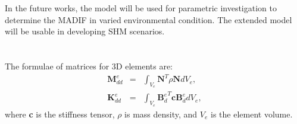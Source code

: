 \documentclass[sensors,article,submit,moreauthors,pdftex]{Definitions/mdpi}
\begin{document}
In the future works, the model will be used for parametric investigation to determine the MADIF in varied environmental condition. 
The extended model will be usable in developing SHM scenarios.

\appendix


\section{}
\label{app:matrices}
The formulae of matrices for 3D elements are:
\begin{eqnarray}
\textbf{M}_{dd}^e & = & \int_{V_e}\textbf{N}^T\rho \textbf{N} dV_e,\\
\textbf{K}_{dd}^e & = & \int_{V_e}{\textbf{B}_d^e}^T\textbf{c}\textbf{B}_d^edV_e,
\end{eqnarray}
where \textbf{c} is the stiffness tensor, \(\rho\) is mass density, and \(V_e\) is the element volume.
\end{document}
